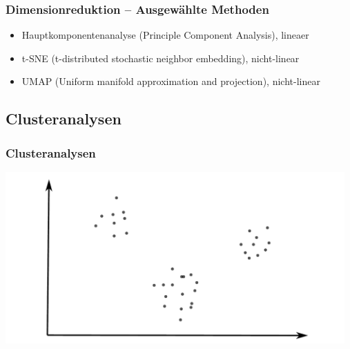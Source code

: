 \documentclass[aspectratio=169]{beamer}
\begin{document}
\begin{frame}
  \frametitle{Dimensionreduktion -- Ausgewählte Methoden}
  \begin{block}{}
    \begin{center}
      \begin{itemize}
      \item Hauptkomponentenanalyse (Principle Component Analysis), lineaer
      \item t-SNE (t-distributed stochastic neighbor embedding), nicht-linear
      \item UMAP (Uniform manifold approximation and projection), nicht-linear
      \end{itemize}
    \end{center}
  \end{block}
\end{frame}

\subsection{Clusteranalysen}

\setcounter{tocdepth}{2}
\begin{frame}{}
   \tableofcontents[currentsubsection,hideothersubsections,
     subsectionstyle=show/shaded]
\end{frame}

\begin{frame}
  \frametitle{Clusteranalysen}
  \begin{center}
    \includegraphics[width=13.0cm]{images/clustering_1.pdf}
  \end{center}  
\end{frame}
\end{document}

